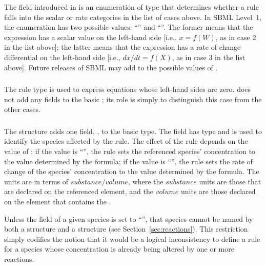 \documentclass[10pt]{cekarticle}
\newcommand{\changed}[1]{\textcolor{BrickRed}{#1}}
\newenvironment{blockChanged}{\color{BrickRed}}{}
\begin{document}
The  field introduced in  is an
enumeration of type  that determines whether a rule falls
into the \changed{scalar or rate categories} in the list of cases above.
In SBML Level~1, the enumeration has two possible values:
``'' and ``''.  The former means that the
expression has a scalar value on the left-hand side [i.e., \changed{$x =
  f(W)$}, as in case 2 in the list above]; the latter means that the
expression has a rate of change differential on the left-hand side
\changed{[i.e., $dx/dt = f(X)$, as in case 3 in the list above]}.  Future
releases of SBML may add to the possible values of .


\subsubsection{}

The rule type  is used to express equations whose
left-hand sides are zero.   does not add any fields to
the basic ; its role is simply to distinguish this case from
the other cases.


\subsubsection{}

The  structure adds one field,
\changed{}, to the basic  type.  The
field \changed{} has type  and is used to
identify the \changed{species} affected by the rule.  The effect of the
rule depends on the value of : if the value is
``'', the rule sets the referenced \changed{species}'
concentration to the value determined by the formula; if the value is
``'', the rule sets the rate of change of the \changed{species}'
concentration to the value determined by the formula.  The units are in
terms of $substance/volume$, where the $substance$ units are those that are
declared on the referenced  element, and the $volume$ units
are those declared on the  element that contains the
.

\begin{blockChanged}
  Unless the  field of a given species is set to
  ``'', that species cannot be named by both a
   structure and a 
  structure (see Section~\ref{sec:reactions}).  This restriction simply
  codifies the notion that it would be a logical inconsistency to define a
  rule for a species whose concentration is already being altered by one or
  more reactions.
\end{blockChanged}
\end{document}
